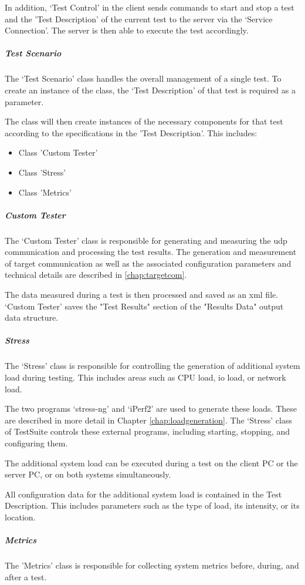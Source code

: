 In addition, `Test Control' in the client sends commands to start and stop a test and the 'Test Description' of the current test to the server via the `Service Connection'. The server is then able to execute the test accordingly.

\subparagraph{Test Scenario}
The `Test Scenario' class handles the overall management of a single test. To create an instance of the class, the `Test Description' of that test is required as a parameter.

The class will then create instances of the necessary components for that test according to the specifications in the 'Test Description'. This includes:
\begin{itemize}
	\item Class 'Custom Tester'
	\item Class 'Stress'
	\item Class 'Metrics'
\end{itemize}

\subparagraph{Custom Tester} \label{chap:customtester}
The `Custom Tester' class is responsible for generating and measuring the \ac{udp} communication and processing the test results. The generation and measurement of target communication as well as the associated configuration parameters and technical details are described in \ref{chap:targetcom}.

The data measured during a test is then processed and saved as an \ac{xml} file. `Custom Tester' saves the "Test Results" section of the "Results Data" output data structure.

\subparagraph{Stress}
The `Stress' class is responsible for controlling the generation of additional system load during testing. This includes areas such as \ac{CPU} load, \ac{io} load, or network load.

The two programs `stress-ng' and `iPerf2' are used to generate these loads. These are described in more detail in Chapter \ref{chap:loadgeneration}. The `Stress' class of TestSuite controls these external programs, including starting, stopping, and configuring them.

The additional system load can be executed during a test on the client PC or the server PC, or on both systems simultaneously.

All configuration data for the additional system load is contained in the Test Description. This includes parameters such as the type of load, its intensity, or its location.

\subparagraph{Metrics} \label{chap:metricsNmon}
The 'Metrics' class is responsible for collecting system metrics before, during, and after a test.

